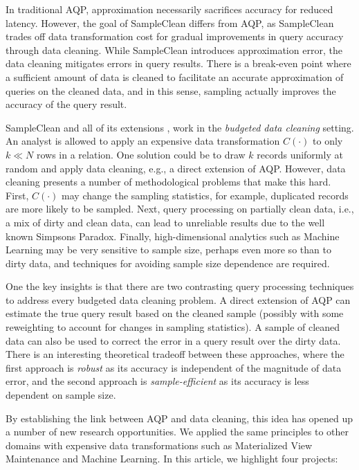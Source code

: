 In traditional AQP, approximation necessarily sacrifices accuracy for reduced latency. 
However, the goal of SampleClean differs from AQP, as SampleClean trades off data transformation cost for gradual improvements in query accuracy through data cleaning.
While SampleClean introduces approximation error, the data cleaning mitigates errors in query results.
There is a break-even point where a sufficient amount of data is cleaned to facilitate an accurate approximation of queries on the cleaned data, and in this sense, sampling actually improves the accuracy of the query result.

SampleClean \cite{wang1999sample} and all of its extensions \cite{krishnan2015svc}, work in the \emph{budgeted data cleaning} setting. 
An analyst is allowed to apply an expensive data transformation $C(\cdot)$ to only $k\ll N$ rows in a relation.
One solution could be to draw $k$ records uniformly at random and apply data cleaning, e.g., a direct extension of AQP.
However, data cleaning presents a number of methodological problems that make this hard.
First, $C(\cdot)$ may change the sampling statistics, for example, duplicated records are more likely to be sampled.
Next, query processing on partially clean data, i.e., a mix of dirty and clean data, can lead to unreliable results due to the well known Simpsons Paradox.
Finally, high-dimensional analytics such as Machine Learning may be very sensitive to sample size, perhaps even more so than to dirty data, and techniques for avoiding sample size dependence are required.

One the key insights is that there are two contrasting query processing techniques to address every budgeted data cleaning problem.
A direct extension of AQP can estimate the true query result based on the cleaned sample (possibly with some reweighting to account for changes in sampling statistics). 
A sample of cleaned data can also be used to correct the error in a query result over the dirty data.
There is an interesting theoretical tradeoff between these approaches, where the first approach is \emph{robust} as its accuracy is independent of the magnitude of data error, and the second approach is \emph{sample-efficient} as its accuracy is less dependent on sample size.

By establishing the link between AQP and data cleaning, this idea has opened up a number of new research opportunities. 
We applied the same principles to other domains with expensive data transformations such as Materialized View Maintenance and Machine Learning.
In this article, we highlight four projects:

